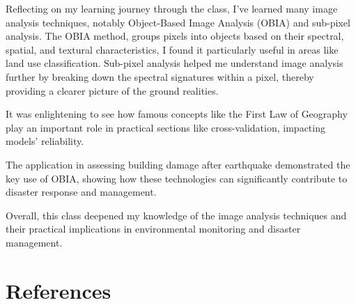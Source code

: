 \documentclass[
  letterpaper,
  DIV=11,
  numbers=noendperiod]{scrreprt}
\begin{document}
Reflecting on my learning journey through the class, I've learned many
image analysis techniques, notably Object-Based Image Analysis (OBIA)
and sub-pixel analysis. The OBIA method, groups pixels into objects
based on their spectral, spatial, and textural characteristics, I found
it particularly useful in areas like land use classification. Sub-pixel
analysis helped me understand image analysis further by breaking down
the spectral signatures within a pixel, thereby providing a clearer
picture of the ground realities.

It was enlightening to see how famous concepts like the First Law of
Geography play an important role in practical sections like
cross-validation, impacting models' reliability.

The application in assessing building damage after earthquake
demonstrated the key use of OBIA, showing how these technologies can
significantly contribute to disaster response and management.

Overall, this class deepened my knowledge of the image analysis
techniques and their practical implications in environmental monitoring
and disaster management.


\chapter*{References}\label{references-1}

\end{document}

